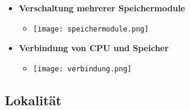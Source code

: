 \begin{itemize}
        \item \textbf{Verschaltung mehrerer Speichermodule}
            \begin{itemize}
                \item[] \texttt{[image: speichermodule.png]}
            \end{itemize}

        \item \textbf{Verbindung von CPU und Speicher}
            \begin{itemize}
                \item[] \texttt{[image: verbindung.png]}
            \end{itemize}
    \end{itemize}
\subsection{Lokalität}

